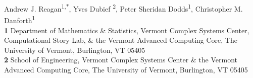 Andrew J. Reagan\textsuperscript{1,*},
Yves Dubief \textsuperscript{2},
Peter Sheridan Dodds\textsuperscript{1},
Christopher M. Danforth\textsuperscript{1}
\\
\bigskip
\textbf{1} Department of Mathematics \& Statistics, Vermont Complex Systems Center, Computational Story Lab, \& the Vermont Advanced Computing Core, The University of Vermont, Burlington, VT 05405
\\
\textbf{2} School of Engineering, Vermont Complex Systems Center \& the Vermont Advanced Computing Core, The University of Vermont, Burlington, VT 05405
\\


